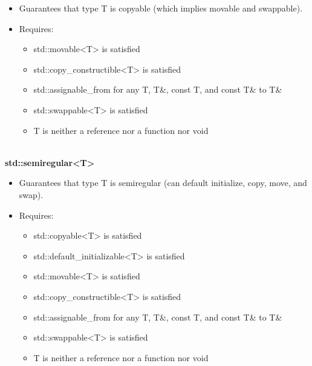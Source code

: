 \begin{itemize}
\item
Guarantees that type T is copyable (which implies movable and swappable).

\item
Requires:
\begin{itemize}
\item
std::movable<T> is satisfied

\item
std::copy\_constructible<T> is satisfied

\item
std::assignable\_from for any T, T\&, const T, and const T\& to T\&

\item
std::swappable<T> is satisfied

\item
T is neither a reference nor a function nor void
\end{itemize}
\end{itemize}

\noindent
\hspace*{\fill} \\ %
\textbf{std::semiregular<T>}

\begin{itemize}
\item
Guarantees that type T is semiregular (can default initialize, copy, move, and swap).

\item
Requires:
\begin{itemize}
\item
std::copyable<T> is satisfied

\item
std::default\_initializable<T> is satisfied

\item
std::movable<T> is satisfied

\item
std::copy\_constructible<T> is satisfied

\item
std::assignable\_from for any T, T\&, const T, and const T\& to T\&

\item
std::swappable<T> is satisfied

\item
T is neither a reference nor a function nor void
\end{itemize}
\end{itemize}

